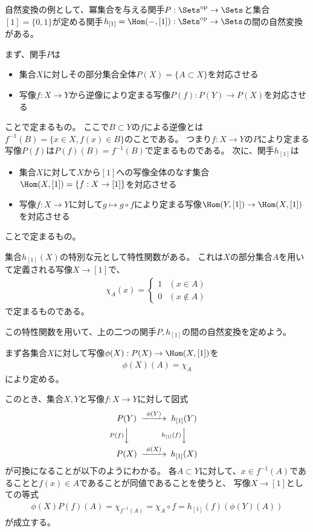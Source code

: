 \documentclass[uplatex]{jsarticle}
\begin{document}
\begin{eg}
自然変換の例として、冪集合を与える関手$P:\Sets^{\rm op} \to \Sets$と集合$[1]=\{0,1\}$が定める関手$h_{[1]}=\Hom(-,[1]):\Sets^{\rm op} \to \Sets$の間の自然変換がある。

まず、関手$P$は
\begin{itemize}
\item 集合$X$に対しその部分集合全体$P(X)=\{A \subset X\}$を対応させる
\item 写像$f:X \to Y$から逆像により定まる写像$P(f):P(Y) \to P(X)$を対応させる
\end{itemize}
ことで定まるもの。
ここで$B \subset Y$の$f$による逆像とは$f^{-1}(B)=\{x \in X, f(x)\in B\}$のことである。
つまり$f:X \to Y$の$P$により定まる写像$P(f)$は$P(f)(B)= f^{-1}(B)$で定まるものである。
次に、関手$h_{[1]}$は
\begin{itemize}
\item 集合$X$に対して$X$から$[1]$への写像全体のなす集合$\Hom(X,[1])=\{f:X \to [1]\}$を対応させる
\item 写像$f:X \to Y$に対して$g \mapsto g \circ f$により定まる写像$\Hom(Y,[1]) \to \Hom(X,[1])$を対応させる
\end{itemize}
ことで定まるもの。

集合$h_{[1]}(X)$の特別な元として特性関数がある。
これは$X$の部分集合$A$を用いて定義される写像$X \to [1]$で、
\begin{align*}
\chi_A(x)=\begin{cases}1 & (x\in A) \\ 0 & (x\notin A)\end{cases}
\end{align*}
で定まるものである。

この特性関数を用いて、上の二つの関手$P, h_{[1]}$の間の自然変換を定めよう。

まず各集合$X$に対して写像$\phi(X):P(X) \to \Hom(X,[1])$を
\begin{align*}
\phi(X)(A) = \chi_A
\end{align*}
により定める。

このとき、集合$X, Y$と写像$f:X \to Y$に対して図式
\[
\begin{CD}
P(Y)@>\phi(Y)>>h_{[1]}(Y)\\
@VP(f)VV@Vh_{[1]}(f)VV\\
P(X)@>\phi(X)>>h_{[1]}(X)
\end{CD}
\]
が可換になることが以下のようにわかる。
各$A \subset Y$に対して、$x\in f^{-1}(A)$であることと$f(x)\in A$であることが同値であることを使うと、
写像$X \to [1]$としての等式
\begin{align*}
\phi(X)P(f)(A)=\chi_{f^{-1}(A)}=\chi_A\circ f=h_{[1]}(f)(\phi(Y)(A))
\end{align*}
が成立する。
\end{eg}
\end{document}
